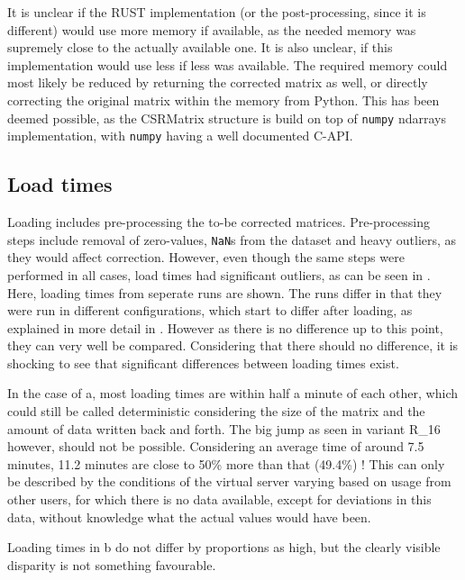 It is unclear if the RUST implementation (or the post-processing, since it is
different) would use more memory if available, as the needed memory was
supremely close to the actually available one. It is also unclear, if this
implementation would use less if less was available. The required memory could
most likely be reduced by returning the corrected matrix as well, or directly
correcting the original matrix within the memory from Python. This has been
deemed possible, as the CSRMatrix structure is build on top of \verb|numpy|
ndarrays implementation, with \verb|numpy| having a well documented C-API.





\subsection{Load times}\label{sec:loadtime}



Loading includes pre-processing the to-be corrected matrices. Pre-processing
steps include removal of zero-values, \verb|NaN|s from the dataset and
heavy outliers, as they would affect correction. However, even though the same
steps were performed in all cases, load times had significant outliers, as can
be seen in . Here, loading times from seperate runs are
shown. The runs differ in that they were run in different configurations, which
start to differ after loading, as explained in more detail in
. However as there is no difference up to this point,
they can very well be compared. Considering that there should no difference, it
is shocking to see that significant differences between loading times exist.

In the case of a, most loading times are within half a
minute of each other, which could still be called deterministic considering the
size of the matrix and the amount of data written back and forth. The big jump
as seen in variant R\_16 however, should not be possible. Considering an
average time of around 7.5 minutes, 11.2 minutes are close to 50\% more than
that (49.4\%) ! This can only be described by the conditions of the virtual
server varying based on usage from other users, for which there is no data
available, except for deviations in this data, without knowledge what the
actual values would have been.

Loading times in b do not differ by proportions as high,
but the clearly visible disparity is not something favourable.


